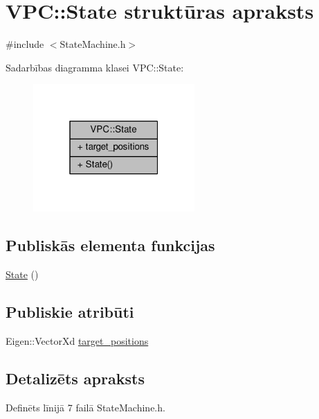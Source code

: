 \hypertarget{struct_v_p_c_1_1_state}{}\section{V\+PC\+:\+:State struktūras apraksts}
\label{struct_v_p_c_1_1_state}


{\ttfamily \#include $<$State\+Machine.\+h$>$}



Sadarbības diagramma klasei V\+PC\+:\+:State\+:
\nopagebreak
\begin{figure}[H]
\begin{center}
\leavevmode
\includegraphics[width=175pt]{struct_v_p_c_1_1_state__coll__graph}
\end{center}
\end{figure}
\subsection*{Publiskās elementa funkcijas}
\begin{DoxyCompactItemize}
\item 
\hyperlink{struct_v_p_c_1_1_state_a94cddcb6972824d5be642b417ffbcac3}{State} ()
\end{DoxyCompactItemize}
\subsection*{Publiskie atribūti}
\begin{DoxyCompactItemize}
\item 
Eigen\+::\+Vector\+Xd \hyperlink{struct_v_p_c_1_1_state_afa512c2cb1be2dd541544d1122c2fac8}{target\+\_\+positions}
\end{DoxyCompactItemize}


\subsection{Detalizēts apraksts}


Definēts līnijā 7 failā State\+Machine.\+h.




